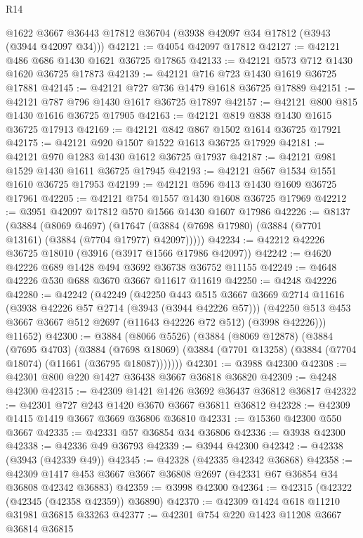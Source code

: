 \begin{lexlean}{R14}
\begin{coremodule}
    @1622
    @3667
    @36443
    @17812
    @36704
    (@3938 @42097 @34 @17812 (@3943 (@3944 @42097 @34)))
@42121 := @4054 @42097 @17812
@42127 := @42121 @486 @686 @1430 @1621 @36725 @17865
@42133 := @42121 @573 @712 @1430 @1620 @36725 @17873
@42139 := @42121 @716 @723 @1430 @1619 @36725 @17881
@42145 := @42121 @727 @736 @1479 @1618 @36725 @17889
@42151 := @42121 @787 @796 @1430 @1617 @36725 @17897
@42157 := @42121 @800 @815 @1430 @1616 @36725 @17905
@42163 := @42121 @819 @838 @1430 @1615 @36725 @17913
@42169 := @42121 @842 @867 @1502 @1614 @36725 @17921
@42175 := @42121 @920 @1507 @1522 @1613 @36725 @17929
@42181 := @42121 @970 @1283 @1430 @1612 @36725 @17937
@42187 := @42121 @981 @1529 @1430 @1611 @36725 @17945
@42193 := @42121 @567 @1534 @1551 @1610 @36725 @17953
@42199 := @42121 @596 @413 @1430 @1609 @36725 @17961
@42205 := @42121 @754 @1557 @1430 @1608 @36725 @17969
@42212 := @3951 @42097 @17812 @570 @1566 @1430 @1607 @17986
@42226 := @8137
    (@3884
      (@8069 @4697)
      (@17647 (@3884 (@7698 @17980) (@3884 (@7701 @13161) (@3884 (@7704 @17977) @42097)))))
@42234 := @42212 @42226 @36725 @18010 (@3916 (@3917 @1566 @17986 @42097))
@42242 := @4620 @42226 @689 @1428 @494 @3692 @36738 @36752 @11155
@42249 := @4648 @42226 @530 @688 @3670 @3667 @11617 @11619
@42250 := @4248 @42226
@42280 := @42242
    (@42249
      (@42250
        @443
        @515
        @3667
        @3669
        @2714
        @11616
        (@3938 @42226 @57 @2714 (@3943 (@3944 @42226 @57)))
        (@42250 @513 @453 @3667 @3667 @512 @2697 (@11643 @42226 @72 @512) (@3998 @42226)))
      @11652)
@42300 := @3884
    (@8066 @5526)
    (@3884
      (@8069 @12878)
      (@3884
        (@7695 @4703)
        (@3884
          (@7698 @18069)
          (@3884 (@7701 @13258) (@3884 (@7704 @18074) (@11661 (@36795 @18087)))))))
@42301 := @3988 @42300
@42308 := @42301 @800 @220 @1427 @36438 @3667 @36818 @36820
@42309 := @4248 @42300
@42315 := @42309 @1421 @1426 @3692 @36437 @36812 @36817
@42322 := @42301 @727 @243 @1420 @3670 @3667 @36811 @36812
@42328 := @42309 @1415 @1419 @3667 @3669 @36806 @36810
@42331 := @15360 @42300 @550 @3667
@42335 := @42331 @57 @36854 @34 @36806
@42336 := @3938 @42300
@42338 := @42336 @49 @36793
@42339 := @3944 @42300
@42342 := @42338 (@3943 (@42339 @49))
@42345 := @42328 (@42335 @42342 @36868)
@42358 := @42309 @1417 @453 @3667 @3667 @36808 @2697 (@42331 @67 @36854 @34 @36808 @42342 @36883)
@42359 := @3998 @42300
@42364 := @42315 (@42322 (@42345 (@42358 @42359)) @36890)
@42370 := @42309 @1424 @618 @11210 @31981 @36815 @33263
@42377 := @42301 @754 @220 @1423 @11208 @3667 @36814 @36815

\end{coremodule}
\end{lexlean}
